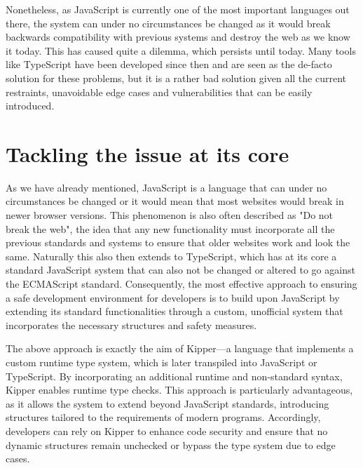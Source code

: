 Nonetheless, as JavaScript is currently one of the most important languages out there, the system can under no circumstances be changed as it would break backwards compatibility with previous systems and destroy the web as we know it today. This has caused quite a dilemma, which persists until today. Many tools like TypeScript have been developed since then and are seen as the de-facto solution for these problems, but it is a rather bad solution given all the current restraints, unavoidable edge cases and vulnerabilities that can be easily introduced.

\section{Tackling the issue at its core}

As we have already mentioned, JavaScript is a language that can under no circumstances be changed or it would mean that most websites would break in newer browser versions. This phenomenon is also often described as "Do not break the web", the idea that any new functionality must incorporate all the previous standards and systems to ensure that older websites work and look the same. Naturally this also then extends to TypeScript, which has at its core a standard JavaScript system that can also not be changed or altered to go against the ECMAScript standard. Consequently, the most effective approach to ensuring a safe development environment for developers is to build upon JavaScript by extending its standard functionalities through a custom, unofficial system that incorporates the necessary structures and safety measures.

The above approach is exactly the aim of Kipper—a language that implements a custom runtime type system, which is later transpiled into JavaScript or TypeScript. By incorporating an additional runtime and non-standard syntax, Kipper enables runtime type checks. This approach is particularly advantageous, as it allows the system to extend beyond JavaScript standards, introducing structures tailored to the requirements of modern programs. Accordingly, developers can rely on Kipper to enhance code security and ensure that no dynamic structures remain unchecked or bypass the type system due to edge cases.

